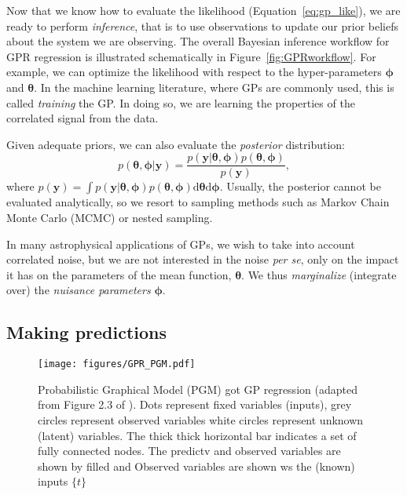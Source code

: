 \documentclass[letterpaper]{ar-1col}
\newcommand{\hyperparams}{\ensuremath{\boldsymbol{\phi}}}
\newcommand{\meanparams}{\ensuremath{\boldsymbol{\theta}}}
\begin{document}
Now that we know how to evaluate the likelihood (Equation~\ref{eq:gp_like}), we are ready to perform \textit{inference}, that is to use observations to update our prior beliefs about the system we are observing. The overall Bayesian inference workflow for GPR regression is illustrated schematically in Figure~\ref{fig:GPRworkflow}. For example, we can optimize the likelihood with respect to the hyper-parameters $\hyperparams$ and $\meanparams$. In the machine learning literature, where GPs are commonly used, this is called \emph{training} the GP. In doing so, we are learning the properties of the correlated signal from the data.

Given adequate priors, we can also evaluate the \emph{posterior} distribution:
\begin{equation}
  p(\meanparams,\hyperparams|\mathbf{y})=\frac{p(\mathbf{y}|\meanparams,\hyperparams)p(\meanparams,\hyperparams)}{p(\mathbf{y})},
\end{equation}
where $p(\mathbf{y})=\int p(\mathbf{y}|\meanparams,\hyperparams)p(\meanparams,\hyperparams) \mathrm{d}\meanparams \mathrm{d}\hyperparams$.
Usually, the posterior cannot be evaluated analytically, so we resort to sampling methods such as Markov Chain Monte Carlo (MCMC) or nested sampling.

In many astrophysical applications of GPs, we wish to take into account correlated noise, but we are not interested in the noise \emph{per se}, only on the impact it has on the parameters of the mean function, $\meanparams$. We thus \emph{marginalize} (integrate over) the \emph{nuisance parameters} $\hyperparams$.


\subsection{Making predictions}
\label{sec:pred}

\begin{figure}[ht]
  \centering
  \texttt{[image: figures/GPR\_PGM.pdf]}
  \caption{Probabilistic Graphical Model (PGM) got GP regression (adapted from Figure 2.3 of \citealt{RW07}). Dots represent fixed variables (inputs), grey circles represent observed variables white circles represent unknown (latent) variables. The thick thick horizontal bar indicates a set of fully connected nodes. The predictv and observed variables are shown by filled and Observed variables are shown ws the (known) inputs $\{t\}$}
  \label{fig:GPR_PGM}
\end{figure}
\end{document}
